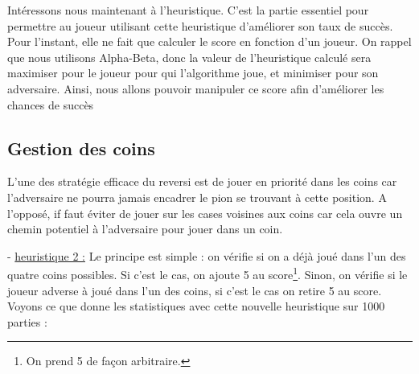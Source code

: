 \documentclass{report}
\begin{document}
Intéressons nous maintenant à l'heuristique. C'est la partie essentiel pour permettre au joueur utilisant cette heuristique d'améliorer son taux de succès. Pour l'instant, elle ne fait que calculer le score en fonction d'un joueur. On rappel que nous utilisons Alpha-Beta, donc la valeur de l'heuristique calculé sera maximiser pour le joueur pour qui l'algorithme joue, et minimiser pour son adversaire. Ainsi, nous allons pouvoir manipuler ce score afin d'améliorer les chances de succès

\subsection{Gestion des coins}
L'une des stratégie efficace du reversi est de jouer en priorité dans les coins car l'adversaire ne pourra jamais encadrer le pion se trouvant à cette position. A l'opposé, if faut éviter de jouer sur les cases voisines aux coins car cela ouvre un chemin potentiel à l'adversaire pour jouer dans un coin.
\newline


- \underline{heuristique 2 :}
Le principe est simple : on vérifie si on a déjà joué dans l'un des quatre coins possibles. Si c'est le cas, on ajoute 5 au score\footnote{On prend 5 de façon arbitraire.}. Sinon, on vérifie si le joueur adverse à joué dans l'un des coins, si c'est le cas on retire 5 au score.
\newline
\newline
Voyons ce que donne les statistiques avec cette nouvelle heuristique sur 1000 parties :
\end{document}
